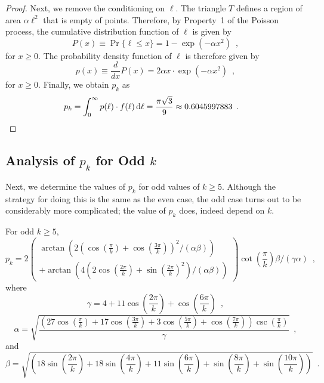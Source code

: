 \documentclass{patmorin}
\begin{document}
\begin{proof}
  Next, we remove the conditioning on $\ell$.  The triangle $T$ defines a
  region of area $\alpha\ell^2$ that is empty of points.  Therefore,
  by Property~1 of the Poisson process, the cumulative distribution
  function of $\ell$ is given by
  \[
    P(x) \equiv \Pr\{\ell \le x\} = 1-\exp(-\alpha x^2) \enspace ,
  \]
  for $x\ge 0$. The probability density function of $\ell$ is therefore 
  given by 
  \[
     p(x) \equiv \frac{d}{dx}P(x) =
     2\alpha x\cdot\exp(-\alpha x^2) \enspace ,
  \]
  for $x\ge 0$.  Finally, we obtain $p_k$ as
  \begin{align*}
     p_k = \int_0^\infty p(\ell)\cdot f(\ell)\,\mathrm{d}\ell 
     = \frac{\pi\sqrt{3}}{9}
      \approx 0.6045997883  \enspace . & \qedhere
  \end{align*}
\end{proof}


\subsection{Analysis of $p_k$ for Odd $k$}

Next, we determine the values of $p_k$ for odd values of $k\ge 5$.
Although the strategy for doing this is the same as the even case,
the odd case turns out to be considerably more complicated; the value
of $p_k$ does, indeed depend on $k$.

\noindent
\begin{minipage}{\textwidth}
\begin{lem}
  For odd $k\ge 5$,
\[
p_k = 
2
\left(\begin{array}{l}
  \arctan\left(
     2\left(\cos\left(\frac{\pi }{k}\right)
       +\cos\left(\frac{3 \pi }{k}\right)\right)^2 / (\alpha\beta) 
  \right) \\
   + \arctan\left(
       4 \left(2 \cos\left(\frac{2 \pi }{k}\right)
       +\sin\left(\frac{2 \pi }{k}\right)^2\right)/(\alpha\beta) 
     \right)
  \end{array}
\right)
\cot\left(\frac{\pi }{k}\right) 
\beta
/
\left(\gamma \alpha\right)\enspace ,
\]
where
\[
\gamma =4+11 \cos\left(\frac{2 \pi }{k}\right)+\cos\left(\frac{6 \pi }{k}\right) \enspace ,
\]
\[
\alpha = 
\sqrt{\frac{\left(27 \cos\left(\frac{\pi }{k}\right)+17 \cos\left(\frac{3 \pi }{k}\right)+3 \cos\left(\frac{5 \pi }{k}\right)+\cos\left(\frac{7 \pi }{k}\right)\right) \csc\left(\frac{\pi }{k}\right)}{\gamma}} \enspace ,
\]
and
\[
\beta = \sqrt{\left(18 \sin\left(\frac{2 \pi }{k}\right)+18 \sin\left(\frac{4 \pi }{k}\right)+11 \sin\left(\frac{6 \pi }{k}\right)+\sin\left(\frac{8 \pi }{k}\right)+\sin\left(\frac{10 \pi }{k}\right)\right)} \enspace .
\]
\end{lem}
\end{minipage}
\end{document}
